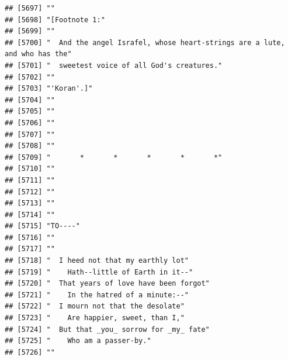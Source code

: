 \documentclass{article}\usepackage[]{graphicx}\usepackage[]{color}
\makeatletter
\newenvironment{kframe}{%
 \def\at@end@of@kframe{}%
 \ifinner\ifhmode%
  \def\at@end@of@kframe{\end{minipage}}%
  \begin{minipage}{\columnwidth}%
 \fi\fi%
 \def\FrameCommand##1{\hskip\@totalleftmargin \hskip-\fboxsep
 \colorbox{shadecolor}{##1}\hskip-\fboxsep
     \hskip-\linewidth \hskip-\@totalleftmargin \hskip\columnwidth}%
 \MakeFramed {\advance\hsize-\width
   \@totalleftmargin\z@ \linewidth\hsize
   \@setminipage}}%
 {\par\unskip\endMakeFramed%
 \at@end@of@kframe}
\newenvironment{knitrout}{}{} %
\makeatother
\begin{document}
\begin{knitrout}
\begin{kframe}
\begin{verbatim}
## [5697] ""                                                                            
## [5698] "[Footnote 1:"                                                                
## [5699] ""                                                                            
## [5700] "  And the angel Israfel, whose heart-strings are a lute, and who has the"    
## [5701] "  sweetest voice of all God's creatures."                                    
## [5702] ""                                                                            
## [5703] "'Koran'.]"                                                                   
## [5704] ""                                                                            
## [5705] ""                                                                            
## [5706] ""                                                                            
## [5707] ""                                                                            
## [5708] ""                                                                            
## [5709] "       *       *       *       *       *"                                    
## [5710] ""                                                                            
## [5711] ""                                                                            
## [5712] ""                                                                            
## [5713] ""                                                                            
## [5714] ""                                                                            
## [5715] "TO----"                                                                      
## [5716] ""                                                                            
## [5717] ""                                                                            
## [5718] "  I heed not that my earthly lot"                                            
## [5719] "    Hath--little of Earth in it--"                                           
## [5720] "  That years of love have been forgot"                                       
## [5721] "    In the hatred of a minute:--"                                            
## [5722] "  I mourn not that the desolate"                                             
## [5723] "    Are happier, sweet, than I,"                                             
## [5724] "  But that _you_ sorrow for _my_ fate"                                       
## [5725] "    Who am a passer-by."                                                     
## [5726] ""                                                                            

\end{verbatim}
\end{kframe}
\end{knitrout}
\end{document}
